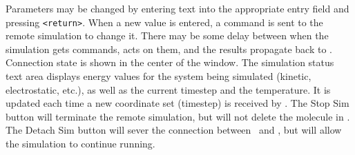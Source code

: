Parameters may be changed by entering text into the appropriate entry field
and pressing {\tt <return>}.
When a new value is entered, a command is sent to the remote simulation 
to change it.  There may be some delay between when the simulation gets 
commands, acts on them, and the results propagate back to \VMD.
Connection state is shown in the center of the window.
The simulation status text area displays energy values for the 
system being simulated (kinetic, electrostatic, etc.),
as well as the current timestep and the temperature.  
It is updated each time a new coordinate set (timestep) 
is received by \VMD.
The {\sf Stop Sim} button will terminate the remote simulation, but
will not delete the molecule in \VMD.
The {\sf Detach Sim} button will sever the connection
between \VMD\ and \NAMD, 
but will allow the simulation to continue running.

